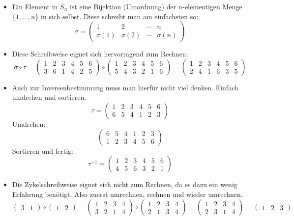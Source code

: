 \documentclass{../../algblatt}
\begin{document}
\begin{itemize}
\item Ein Element in $S_n$ ist eine Bijektion (Umordnung) der $n$-elementigen
Menge~$\{1,\ldots,n\}$ in sich selbst. Diese schreibt man am einfachsten so:
\[ \sigma = \begin{pmatrix}
  1 & 2 & \cdots & n \\
  \sigma(1) & \sigma(2) & \cdots & \sigma(n)
\end{pmatrix} \]

\item Diese Schreibweise eignet sich hervorragend zum Rechnen:
\[ \sigma \circ \tau = \begin{pmatrix}
  1 & 2 & 3 & 4 & 5 & 6 \\
  3 & 6 & 1 & 4 & 2 & 5
  \end{pmatrix} \circ
  \begin{pmatrix}
  1 & 2 & 3 & 4 & 5 & 6 \\
  5 & 4 & 3 & 2 & 1 & 6
  \end{pmatrix} =
  \begin{pmatrix}
  1 & 2 & 3 & 4 & 5 & 6 \\
  2 & 4 & 1 & 6 & 3 & 5
  \end{pmatrix} \]

\item Auch zur Inversenbestimmung muss man hierfür nicht viel denken. Einfach
umdrehen und sortieren.
\[ \tau = \begin{pmatrix}
  1 & 2 & 3 & 4 & 5 & 6 \\
  6 & 5 & 4 & 1 & 2 & 3
\end{pmatrix} \]
Umdrehen:
\[ \begin{pmatrix}
  6 & 5 & 4 & 1 & 2 & 3 \\
  1 & 2 & 3 & 4 & 5 & 6
\end{pmatrix} \]
Sortieren und fertig:
\[ \tau^{-1} =
  \begin{pmatrix}
  1 & 2 & 3 & 4 & 5 & 6 \\
  4 & 5 & 6 & 3 & 2 & 1
  \end{pmatrix} \]

\item Die Zykelschreibweise eignet sich nicht zum Rechnen, da es dazu ein wenig
Erfahrung benötigt. Also zuerst umrechnen, rechnen und wieder umrechnen.
\[
  \begin{pmatrix}
  3 & 1
  \end{pmatrix}
  \circ
  \begin{pmatrix}
  1 & 2
  \end{pmatrix}
  =
  \begin{pmatrix}
  1 & 2 & 3 & 4 \\
  3 & 2 & 1 & 4 
  \end{pmatrix}
  \circ
  \begin{pmatrix}
  1 & 2 & 3 & 4 \\
  2 & 1 & 3 & 4 
  \end{pmatrix}
  =
  \begin{pmatrix}
  1 & 2 & 3 & 4 \\
  2 & 3 & 1 & 4 
  \end{pmatrix}
  =
  \begin{pmatrix}
  1 & 2 & 3
  \end{pmatrix}
\]


\end{itemize}
\end{document}
